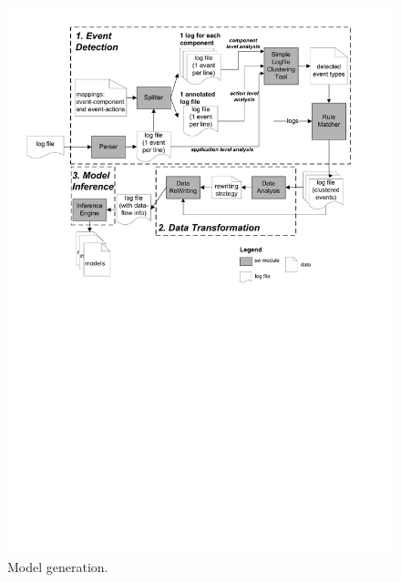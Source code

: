 \begin{figure}[ht!]
    \begin{center}
        \includegraphics[width=12cm]{images/approach2}
    \end{center}
    \caption{Model generation.} \label{fig:modelInference}
\end{figure}


